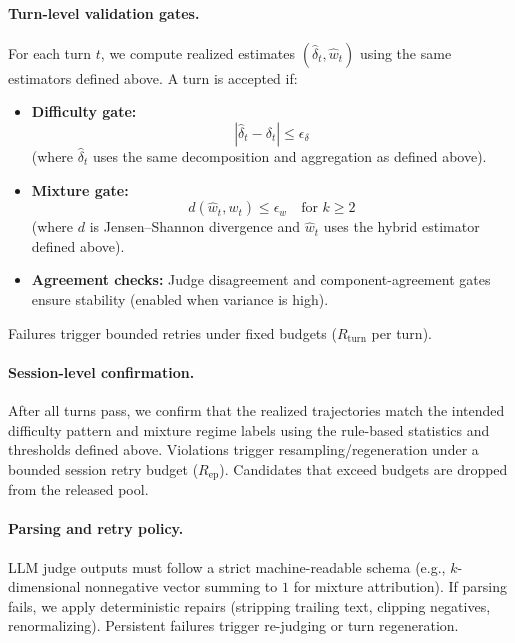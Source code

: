 \paragraph{Turn-level validation gates.}
For each turn $t$, we compute realized estimates $(\hat{\delta}_t,\hat{w}_t)$ using the same estimators defined above. A turn is accepted if:
\begin{itemize}[leftmargin=1.2em,itemsep=0.1em]
    \item \textbf{Difficulty gate:} 
    \begin{equation}
    \left|\hat{\delta}_t - \delta_t\right| \le \epsilon_{\delta}
    \label{eq:val_diff_gate}
    \end{equation}
    (where $\hat{\delta}_t$ uses the same decomposition and aggregation as defined above).
    \item \textbf{Mixture gate:} 
    \begin{equation}
    d(\hat{w}_t, w_t) \le \epsilon_w \quad \text{for } k\ge 2
    \label{eq:val_mix_gate}
    \end{equation}
    (where $d$ is Jensen--Shannon divergence and $\hat{w}_t$ uses the hybrid estimator defined above).
    \item \textbf{Agreement checks:} Judge disagreement and component-agreement gates ensure stability (enabled when variance is high).
\end{itemize}
Failures trigger bounded retries under fixed budgets ($R_{\mathrm{turn}}$ per turn).

\paragraph{Session-level confirmation.}
After all turns pass, we confirm that the realized trajectories match the intended difficulty pattern and mixture regime labels using the rule-based statistics and thresholds defined above. Violations trigger resampling/regeneration under a bounded session retry budget ($R_{\mathrm{ep}}$). Candidates that exceed budgets are dropped from the released pool.

\paragraph{Parsing and retry policy.}
LLM judge outputs must follow a strict machine-readable schema (e.g., $k$-dimensional nonnegative vector summing to $1$ for mixture attribution). If parsing fails, we apply deterministic repairs (stripping trailing text, clipping negatives, renormalizing). Persistent failures trigger re-judging or turn regeneration.

